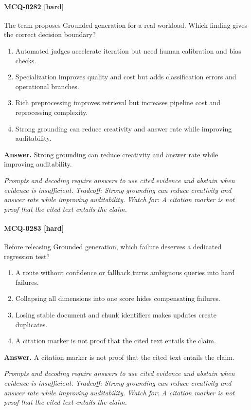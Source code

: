 \paragraph{MCQ-0282 [hard]} The team proposes Grounded generation for a real workload. Which finding gives the correct decision boundary?
\begin{enumerate}[label=\Alph*.]
\item Automated judges accelerate iteration but need human calibration and bias checks.
\item Specialization improves quality and cost but adds classification errors and operational branches.
\item Rich preprocessing improves retrieval but increases pipeline cost and reprocessing complexity.
\item Strong grounding can reduce creativity and answer rate while improving auditability.
\end{enumerate}
\noindent\textbf{Answer.} Strong grounding can reduce creativity and answer rate while improving auditability.
\par\textit{Prompts and decoding require answers to use cited evidence and abstain when evidence is insufficient. Tradeoff: Strong grounding can reduce creativity and answer rate while improving auditability. Watch for: A citation marker is not proof that the cited text entails the claim.}
\paragraph{MCQ-0283 [hard]} Before releasing Grounded generation, which failure deserves a dedicated regression test?
\begin{enumerate}[label=\Alph*.]
\item A route without confidence or fallback turns ambiguous queries into hard failures.
\item Collapsing all dimensions into one score hides compensating failures.
\item Losing stable document and chunk identifiers makes updates create duplicates.
\item A citation marker is not proof that the cited text entails the claim.
\end{enumerate}
\noindent\textbf{Answer.} A citation marker is not proof that the cited text entails the claim.
\par\textit{Prompts and decoding require answers to use cited evidence and abstain when evidence is insufficient. Tradeoff: Strong grounding can reduce creativity and answer rate while improving auditability. Watch for: A citation marker is not proof that the cited text entails the claim.}
